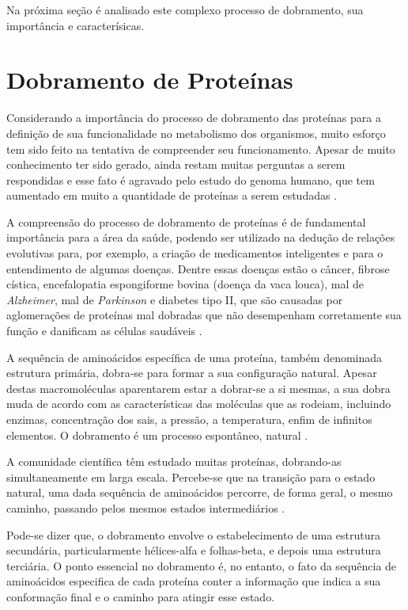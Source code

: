\documentclass[dm,ppgcomp]{texfurg}
\begin{document}
Na próxima seção é analisado este complexo processo de dobramento, sua importância e caracterísicas.

\section{Dobramento de Proteínas}

Considerando a importância do processo de dobramento das proteínas para a definição de sua funcionalidade no metabolismo dos organismos, muito esforço tem sido feito na tentativa de compreender seu funcionamento. Apesar de muito conhecimento ter sido gerado, ainda restam muitas perguntas a serem respondidas e esse fato é agravado pelo estudo do genoma humano, que tem aumentado em muito a quantidade de proteínas a serem estudadas \cite{ptitsyn1996determinable} .

A compreensão do processo de dobramento de proteínas é de fundamental importância para a área da saúde, podendo ser utilizado na dedução de relações evolutivas para, por exemplo, a criação de medicamentos inteligentes e para o entendimento de algumas doenças. Dentre essas doenças estão o câncer, fibrose cística, encefalopatia espongiforme bovina (doença da vaca louca), mal de {\it Alzheimer}, mal de {\it Parkinson} e diabetes tipo II, que são causadas por aglomerações de proteínas mal dobradas que não desempenham corretamente sua função e danificam as células saudáveis \cite{dobson1999protein}.

A sequência de aminoácidos específica de uma proteína, também denominada estrutura primária, dobra-se para formar a sua configuração natural. Apesar destas macromoléculas aparentarem estar a dobrar-se a si mesmas, a sua dobra muda de acordo com as características das moléculas que as rodeiam, incluindo enzimas, concentração dos sais, a pressão, a temperatura, enfim de infinitos elementos. O dobramento é um processo espontâneo, natural \cite{anfinsen1973principles}.

A comunidade científica têm estudado muitas proteínas, dobrando-as simultaneamente em larga escala. Percebe-se que na transição para o estado natural, uma dada sequência de aminoácidos percorre, de forma geral, o mesmo caminho, passando pelos mesmos estados intermediários \cite{anfinsen1973principles}.

Pode-se dizer que, o dobramento envolve o estabelecimento de uma estrutura secundária, particularmente hélices-alfa e folhas-beta, e depois uma estrutura terciária. O ponto essencial no dobramento é, no entanto, o fato da sequência de aminoácidos especifica de cada proteína conter a informação que indica a sua conformação final e o caminho para atingir esse estado.
\end{document}
